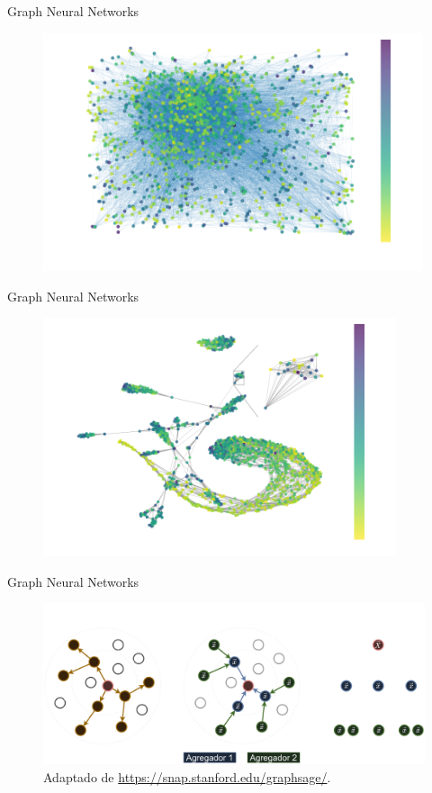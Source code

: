 \begin{frame}[c]{Graph Neural Networks}
    \begin{figure}
        \centering
        \includegraphics[height=7cm]{images/galaxy_graph.pdf}
    \end{figure}
\end{frame}

\begin{frame}[c]{Graph Neural Networks}
    \begin{figure}
        \centering
        \includegraphics[height=7cm]{images/galaxy_graph_gnn.pdf}
    \end{figure}
\end{frame}

\begin{frame}[c]{Graph Neural Networks}
    \begin{figure}
        \centering
        \includegraphics[width=0.9\linewidth]{images/gnn_message.png}
        \caption{Adaptado de \url{https://snap.stanford.edu/graphsage/}.}
    \end{figure}
\end{frame}


